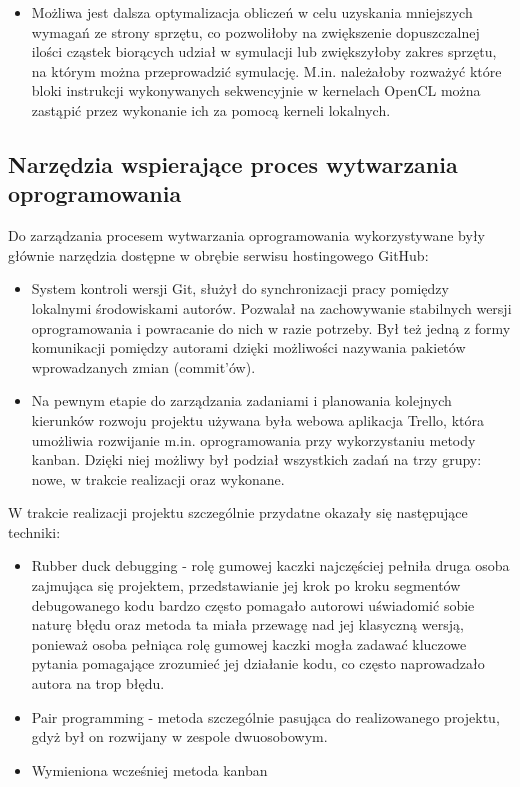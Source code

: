\documentclass[polish, 12pt]{aghthesis}
\begin{document}
\begin{itemize}
			\item Możliwa jest dalsza optymalizacja obliczeń w celu uzyskania mniejszych wymagań ze strony sprzętu, co pozwoliłoby na zwiększenie dopuszczalnej ilości cząstek biorących udział w symulacji lub zwiększyłoby zakres sprzętu, na którym można przeprowadzić symulację. M.in. należałoby rozważyć które bloki instrukcji wykonywanych sekwencyjnie w kernelach OpenCL można zastąpić przez wykonanie ich za pomocą kerneli lokalnych.
		
		\end{itemize}
		
	\subsection{Narzędzia wspierające proces wytwarzania oprogramowania}
	
		Do zarządzania procesem wytwarzania oprogramowania wykorzystywane były głównie narzędzia dostępne w obrębie serwisu hostingowego GitHub:
		
		\begin{itemize}
		
			\item System kontroli wersji Git, służył do synchronizacji pracy pomiędzy lokalnymi środowiskami autorów. Pozwalał na zachowywanie stabilnych wersji oprogramowania i powracanie do nich w razie potrzeby. Był też jedną z formy komunikacji pomiędzy autorami dzięki możliwości nazywania pakietów wprowadzanych zmian (commit'ów).
			
			\item Na pewnym etapie do zarządzania zadaniami i planowania kolejnych kierunków rozwoju projektu używana była webowa aplikacja Trello, która umożliwia rozwijanie m.in. oprogramowania przy wykorzystaniu metody kanban. Dzięki niej możliwy był podział wszystkich zadań na trzy grupy: nowe, w trakcie realizacji oraz wykonane.
		
		\end{itemize}
		
		W trakcie realizacji projektu szczególnie przydatne okazały się następujące techniki:
		
		\begin{itemize}

			\item Rubber duck debugging - rolę gumowej kaczki najczęściej pełniła druga osoba zajmująca się projektem, przedstawianie jej krok po kroku segmentów debugowanego kodu bardzo często pomagało autorowi uświadomić sobie naturę błędu oraz metoda ta miała przewagę nad jej klasyczną wersją, ponieważ osoba pełniąca rolę gumowej kaczki mogła zadawać kluczowe pytania pomagające zrozumieć jej działanie kodu, co często naprowadzało autora na trop błędu.
			
			\item Pair programming - metoda szczególnie pasująca do realizowanego projektu, gdyż był on rozwijany w zespole dwuosobowym.
			
			\item Wymieniona wcześniej metoda kanban
		
		\end{itemize}
		
\end{document}
